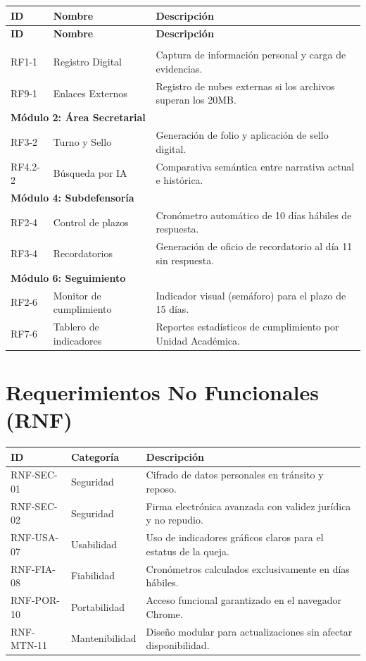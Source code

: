 \documentclass{article}
\begin{document}
\begin{longtable}{|l|p{4cm}|p{8cm}|}
\hline
\textbf{ID} & \textbf{Nombre} & \textbf{Descripción} \\ \hline
\endfirsthead
\hline
\textbf{ID} & \textbf{Nombre} & \textbf{Descripción} \\ \hline
\endhead
\hline
\endfoot
\multicolumn{3}{|l|}{\textbf{Módulo 1: Quejoso}} \\ \hline
RF1-1 & Registro Digital & Captura de información personal y carga de evidencias.  \\ \hline
RF9-1 & Enlaces Externos & Registro de nubes externas si los archivos superan los 20MB.  \\ \hline
\multicolumn{3}{|l|}{\textbf{Módulo 2: Área Secretarial}} \\ \hline
RF3-2 & Turno y Sello & Generación de folio y aplicación de sello digital.  \\ \hline
RF4.2-2 & Búsqueda por IA & Comparativa semántica entre narrativa actual e histórica.  \\ \hline
\multicolumn{3}{|l|}{\textbf{Módulo 4: Subdefensoría}} \\ \hline
RF2-4 & Control de plazos & Cronómetro automático de 10 días hábiles de respuesta.  \\ \hline
RF3-4 & Recordatorios & Generación de oficio de recordatorio al día 11 sin respuesta.  \\ \hline
\multicolumn{3}{|l|}{\textbf{Módulo 6: Seguimiento}} \\ \hline
RF2-6 & Monitor de cumplimiento & Indicador visual (semáforo) para el plazo de 15 días.  \\ \hline
RF7-6 & Tablero de indicadores & Reportes estadísticos de cumplimiento por Unidad Académica.  \\ \hline
\end{longtable}

\section*{Requerimientos No Funcionales (RNF)}

\begin{longtable}{|l|l|p{8.5cm}|}
\hline
\textbf{ID} & \textbf{Categoría} & \textbf{Descripción} \\ \hline
RNF-SEC-01 & Seguridad & Cifrado de datos personales en tránsito y reposo.  \\ \hline
RNF-SEC-02 & Seguridad & Firma electrónica avanzada con validez jurídica y no repudio.  \\ \hline
RNF-USA-07 & Usabilidad & Uso de indicadores gráficos claros para el estatus de la queja.  \\ \hline
RNF-FIA-08 & Fiabilidad & Cronómetros calculados exclusivamente en días hábiles.  \\ \hline
RNF-POR-10 & Portabilidad & Acceso funcional garantizado en el navegador Chrome.  \\ \hline
RNF-MTN-11 & Mantenibilidad & Diseño modular para actualizaciones sin afectar disponibilidad.  \\ \hline
\end{longtable}
\end{document}
